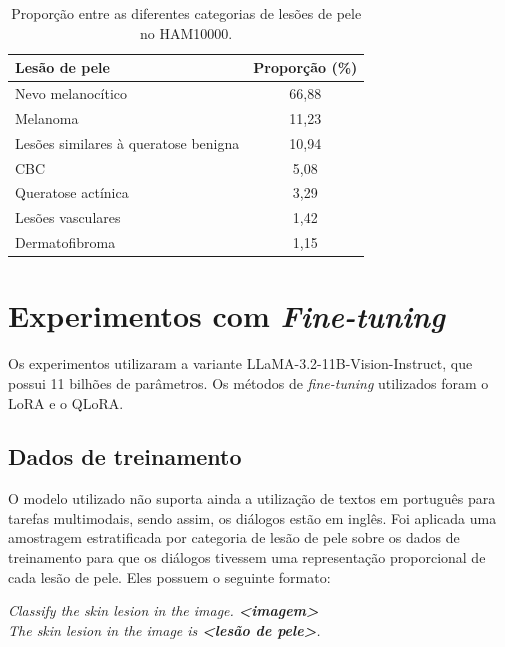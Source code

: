 \begin{table}[ht]
    \caption{\small Proporção entre as diferentes categorias de lesões de pele no \ac{HAM10000}.}
    \centering
    \begin{tabular}{l|c}
        \hline
        Lesão de pele                        & Proporção (\%) \\ \hline
        Nevo melanocítico                    & 66,88          \\
        Melanoma                             & 11,23          \\
        Lesões similares à queratose benigna & 10,94          \\
        CBC                                  & 5,08           \\
        Queratose actínica                   & 3,29           \\
        Lesões vasculares                    & 1,42           \\
        Dermatofibroma                       & 1,15           \\ \hline
    \end{tabular}
    \label{tab:ham10000_proportion}
\end{table}

\section{Experimentos com \textit{Fine-tuning}}

Os experimentos utilizaram a variante \ac{LLaMA}-3.2-11B-Vision-Instruct, que possui 11 bilhões de parâmetros. Os métodos de \textit{fine-tuning} utilizados foram o
\ac{LoRA} e o \ac{QLoRA}.

\subsection{Dados de treinamento}

O modelo utilizado não suporta ainda a utilização de textos em português para tarefas multimodais, sendo assim, os diálogos estão em inglês. Foi aplicada uma amostragem
estratificada por categoria de lesão de pele sobre os dados de treinamento para que os diálogos tivessem uma representação proporcional de cada lesão de pele. Eles
possuem o seguinte formato:

\begin{dialogue}
     \textit{Classify the skin lesion in the image. \textbf{<imagem>}} \\
     \textit{The skin lesion in the image is \textbf{<lesão de pele>}.}
\end{dialogue}

